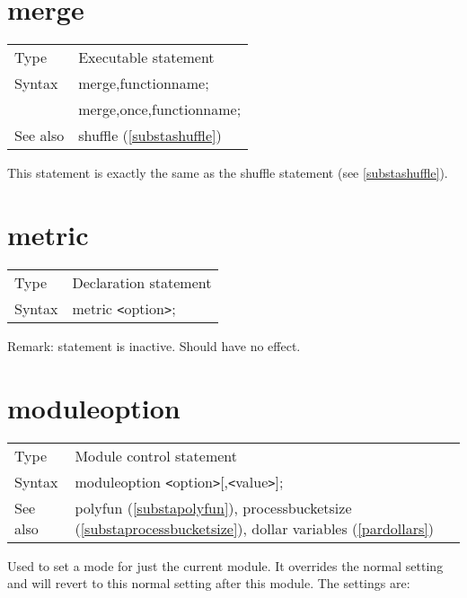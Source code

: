 %
\section{merge}
\label{substamerge}

\noindent \begin{tabular}{ll}
Type & Executable statement\\
Syntax & merge,functionname; \\
       & merge,once,functionname;
\\ See also & shuffle (\ref{substashuffle})
\end{tabular} \vspace{4mm}

\noindent This statement is exactly the same as the shuffle 
statement (see \ref{substashuffle}).
\vspace{10mm}
%

\section{metric}
\label{substametric}

\noindent \begin{tabular}{ll}
Type & Declaration statement\\
Syntax & metric {\tt<}option{\tt>};
\end{tabular}
\smallskip

\noindent Remark: statement is inactive. 
Should have no effect.
\vspace{10mm}


\section{moduleoption}
\label{substamoduleoption}

\noindent \begin{tabular}{ll}
Type & Module control statement\\
Syntax & moduleoption {\tt<}option{\tt>}[,{\tt<}value{\tt>}];
\\ See also & polyfun (\ref{substapolyfun}),
              processbucketsize (\ref{substaprocessbucketsize}),
              dollar variables (\ref{pardollars})
\end{tabular} \vspace{4mm}

\noindent Used to set a mode for just the current 
module. It overrides the normal setting and will revert to this normal 
setting after this module. The settings are:

